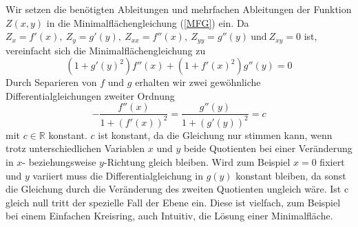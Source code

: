 \begin{refsection}
Wir setzen die benötigten Ableitungen und mehrfachen Ableitungen der Funktion $Z(x,y)$ in die Minimalflächengleichung (\ref{MFG}) ein. Da $ Z_x = f'(x),\ Z_y = g'(y),\ Z_{xx}=f''(x),\ Z_{yy} = g''(y) \ \text{und} \ Z_{xy}=0$ ist, vereinfacht sich die Minimalflächengleichung zu 
\begin{equation}\label{MFG Scherk}
(1+g'(y)^2)f''(x)+(1+f'(x)^2)g''(y)=0
\end{equation}
Durch Separieren von $f$ und $g$ erhalten wir zwei gewöhnliche Differentialgleichungen zweiter Ordnung
\begin{equation}\label{MFG Scherk2}
-\dfrac{f''(x)}{1+(f'(x))^2}=\dfrac{g''(y)}{1+(g'(y))^2}=c
\end{equation}
mit $c \in \mathbb{R}$ konstant. $c$ ist konstant, da die Gleichung nur stimmen kann, wenn trotz unterschiedlichen Variablen $x$ und $y$ beide Quotienten bei einer Veränderung in $x$- beziehungsweise $y$-Richtung gleich bleiben. Wird zum Beispiel $x=0$ fixiert und $y$ variiert muss die Differentialgleichung in $g(y)$ konstant bleiben, da sonst die Gleichung durch die Veränderung des zweiten Quotienten ungleich wäre. Ist c gleich null tritt der spezielle Fall der Ebene ein. Diese ist vielfach, zum Beispiel bei einem Einfachen Kreisring, auch Intuitiv, die Lösung einer Minimalfläche.


\end{refsection}
